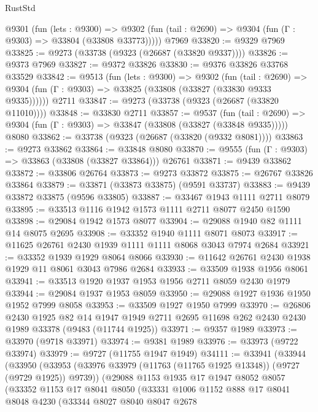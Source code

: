 \begin{lexlean}{RustStd}
\begin{coremodule}
{\begin{coremodule}
{{{{{{{{{{{{{{{{{{{{{{{{{{{{{{{{{{{{{{{{{{{{{{{{{{{{{{{    @9301
      (fun (lets : @9300) =>
      @9302 (fun (tail : @2690) => @9304 (fun (Γ : @9303) => @33804 (@33808 @33773)))))
    @7969
@33820 := @9329 @7969
@33825 := @9273 (@33738 (@9323 (@26687 (@33820 @9337))))
@33826 := @9373 @7969
@33827 := @9372 @33826
@33830 := @9376 @33826 @33768 @33529
@33842 := @9513
    (fun (lets : @9300) =>
    @9302
      (fun (tail : @2690) =>
      @9304 (fun (Γ : @9303) => @33825 (@33808 (@33827 (@33830 @9333 @9335))))))
    @2711
@33847 := @9273 (@33738 (@9323 (@26687 (@33820 @11010))))
@33848 := @33830 @2711
@33857 := @9537
    (fun (tail : @2690) => @9304 (fun (Γ : @9303) => @33847 (@33808 (@33827 (@33848 @9335)))))
    @8080
@33862 := @33738 (@9323 (@26687 (@33820 (@9332 @8081))))
@33863 := @9273 @33862
@33864 := @33848 @8080
@33870 := @9555 (fun (Γ : @9303) => @33863 (@33808 (@33827 @33864))) @26761
@33871 := @9439 @33862
@33872 := @33806 @26764
@33873 := @9273 @33872
@33875 := @26767 @33826 @33864
@33879 := @33871 (@33873 @33875) (@9591 @33737)
@33883 := @9439 @33872 @33875 (@9596 @33805)
@33887 := @33467 @1943 @1111 @2711 @8079
@33895 := @33513 @1116 @1942 @1573 @1111 @2711 @8077 @2450 @1590
@33898 := @29084 @1942 @1573 @8077
@33904 := @29088 @1940 @82 @1111 @14 @8075 @2695
@33908 := @33352 @1940 @1111 @8071 @8073
@33917 := @11625 @26761 @2430 @1939 @1111 @1111 @8068 @3043 @7974 @2684
@33921 := @33352 @1939 @1929 @8064 @8066
@33930 := @11642 @26761 @2430 @1938 @1929 @11 @8061 @3043 @7986 @2684
@33933 := @33509 @1938 @1956 @8061
@33941 := @33513 @1920 @1937 @1953 @1956 @2711 @8059 @2430 @1979
@33944 := @29084 @1937 @1953 @8059
@33950 := @29088 @1927 @1936 @1950 @1952 @7999 @8058
@33953 := @33509 @1927 @1950 @7999
@33970 := @26806
    @2430
    @1925
    @82
    @14
    @1947
    @1949
    @2711
    @2695
    @11698
    @262
    @2430
    @2430
    @1989
    @33378
    (@9483 (@11744 @1925))
@33971 := @9357 @1989
@33973 := @33970 (@9718 @33971)
@33974 := @9381 @1989
@33976 := @33973 (@9722 @33974)
@33979 := @9727 (@11755 @1947 @1949)
@34111 := @33941
    (@33944
      (@33950
        (@33953 (@33976 @33979 (@11763 (@11765 @1925 @13348)) (@9727 (@9729 @1925)) @9739))
        (@29088
          @1153
          @1935
          @17
          @1947
          @8052
          @8057
          (@33352
            @1153
            @17
            @8041
            @8050
            (@33331
              @1006
              @1152
              @888
              @17
              @8041
              @8048
              @4230
              (@33344
                @8027
                @8040
                @8047
                @2678
}}}}}}}}}}}}}}}}}}}}}}}}}}}}}}}}}}}}}}}}}}}}}}}}}}}}}}}
\end{coremodule}}
\end{coremodule}
\end{lexlean}
